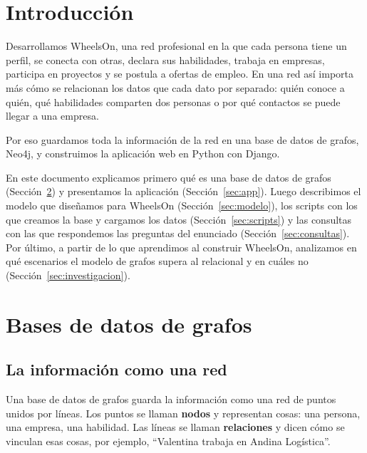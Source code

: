 \documentclass[11pt, a4paper]{article}
\begin{document}
\setcounter{tocdepth}{2}
\begingroup\small\setlength{\parskip}{0.1em}\tableofcontents\endgroup
\newpage

\section{Introducción}

Desarrollamos WheelsOn, una red profesional en la que cada persona tiene un perfil, se
conecta con otras, declara sus habilidades, trabaja en empresas, participa en proyectos
y se postula a ofertas de empleo. En una red así importa más cómo se
relacionan los datos que cada dato por separado: quién conoce a quién, qué habilidades comparten dos personas o por qué
contactos se puede llegar a una empresa.

Por eso guardamos toda la información de la red en una base de datos de grafos, Neo4j,
y construimos la aplicación web en Python con Django.

En este documento explicamos primero qué es una base de datos de grafos
(Sección~\ref{sec:grafos}) y presentamos la aplicación (Sección~\ref{sec:app}). Luego
describimos el modelo que diseñamos para WheelsOn (Sección~\ref{sec:modelo}), los
scripts con los que creamos la base y cargamos los datos (Sección~\ref{sec:scripts}) y
las consultas con las que respondemos las preguntas del enunciado
(Sección~\ref{sec:consultas}). Por último, a partir de lo que aprendimos al construir
WheelsOn, analizamos en qué escenarios el modelo de grafos supera al relacional y en
cuáles no (Sección~\ref{sec:investigacion}).

\section{Bases de datos de grafos}\label{sec:grafos}

\subsection{La información como una red}

Una base de datos de grafos guarda la información como una red de puntos unidos por
líneas. Los puntos se llaman \textbf{nodos} y representan cosas: una persona, una
empresa, una habilidad. Las líneas se llaman \textbf{relaciones} y dicen cómo se
vinculan esas cosas, por ejemplo, ``Valentina trabaja en Andina Logística''.
\end{document}
